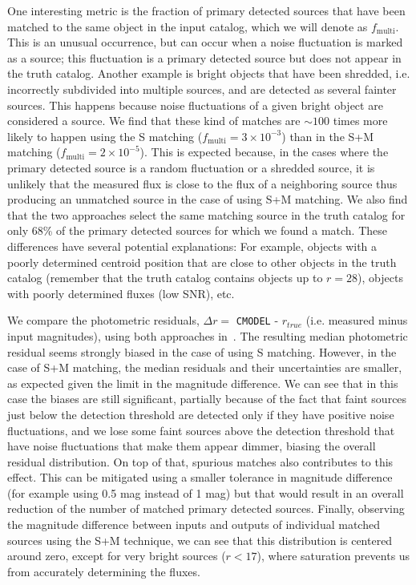 \documentclass[a4paper,fleqn,usenatbib]{mnras}
\begin{document}
One interesting metric is the fraction of primary detected sources that have been matched to the same object in the input catalog, which we will denote as $f_{\mathrm{multi}}$. This is an unusual occurrence, but can occur when a noise fluctuation is marked as a source; this fluctuation is a primary detected source but does not appear in the truth catalog. Another example is bright objects that have been shredded, i.e. incorrectly subdivided into multiple sources, and are detected as several fainter sources. This happens because noise fluctuations of a given bright object are considered a source. We find that these kind of matches are $\sim 100$ times more likely to happen using the \textsf{S} matching ($f_{\mathrm{multi}} = 3 \times 10^{-3}$) than in the \textsf{S+M} matching ($ f_{\mathrm{multi}} = 2 \times 10^{-5}$). This is expected because, in the cases where the primary detected source is a random fluctuation or a shredded source, it is unlikely that the measured flux is close to the flux of a neighboring source thus producing an unmatched source in the case of using \textsf{S+M} matching. We also find that the two approaches select the same matching source in the truth catalog for only 68\% of the primary detected sources for which we found a match. These differences have several potential explanations: For example, objects with a poorly determined centroid position that are close to other objects in the truth catalog (remember that the truth catalog contains objects up to $r=28$), objects with poorly determined fluxes (low SNR), etc.

We compare the photometric residuals, $\Delta r = $ \texttt{CMODEL} - $r_{true}$ (i.e. measured minus input magnitudes), using both approaches in~. The resulting median photometric residual seems strongly biased in the case of using \textsf{S} matching. However, in the case of \textsf{S+M} matching, the median residuals and their uncertainties are smaller, as expected given the limit in the magnitude difference. We can see that in this case the biases are still significant, partially because of the fact that faint sources just below the detection threshold are detected only if they have positive noise fluctuations, and we lose some faint sources above the detection threshold that have noise fluctuations that make them appear dimmer, biasing the overall residual distribution. On top of that, spurious matches also contributes to this effect. This can be mitigated using a smaller tolerance in magnitude difference (for example using 0.5 mag instead of 1 mag) but that would result in an overall reduction of the number of matched primary detected sources. Finally, observing the magnitude difference between inputs and outputs of individual matched sources using the \textsf{S+M} technique, we can see that this distribution is centered around zero, except for very bright sources ($r < 17$), where saturation prevents us from accurately determining the fluxes. 
\end{document}
